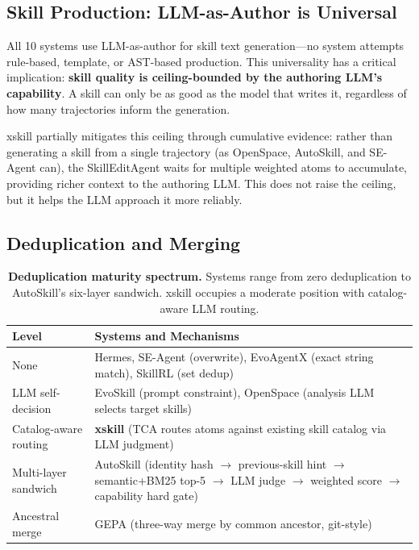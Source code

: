 \documentclass{article}
\begin{document}
\subsection{Skill Production: LLM-as-Author is Universal}

All 10 systems use LLM-as-author for skill text generation---no system attempts rule-based, template, or AST-based production. This universality has a critical implication: \textbf{skill quality is ceiling-bounded by the authoring LLM's capability}. A skill can only be as good as the model that writes it, regardless of how many trajectories inform the generation.

xskill partially mitigates this ceiling through cumulative evidence: rather than generating a skill from a single trajectory (as OpenSpace, AutoSkill, and SE-Agent can), the SkillEditAgent waits for multiple weighted atoms to accumulate, providing richer context to the authoring LLM. This does not raise the ceiling, but it helps the LLM approach it more reliably.

\subsection{Deduplication and Merging}

\begin{table}[t]
\centering
\caption{\textbf{Deduplication maturity spectrum.} Systems range from zero deduplication to AutoSkill's six-layer sandwich. xskill occupies a moderate position with catalog-aware LLM routing.}
\label{tab:dedup}
\small
\begin{tabular}{@{}lp{6.5cm}@{}}
\toprule
\textbf{Level} & \textbf{Systems and Mechanisms} \\
\midrule
None & Hermes, SE-Agent (overwrite), EvoAgentX (exact string match), SkillRL (set dedup) \\
LLM self-decision & EvoSkill (prompt constraint), OpenSpace (analysis LLM selects target skills) \\
Catalog-aware routing & \textbf{xskill} (TCA routes atoms against existing skill catalog via LLM judgment) \\
Multi-layer sandwich & AutoSkill (identity hash $\to$ previous-skill hint $\to$ semantic+BM25 top-5 $\to$ LLM judge $\to$ weighted score $\to$ capability hard gate) \\
Ancestral merge & GEPA (three-way merge by common ancestor, git-style) \\
\bottomrule
\end{tabular}
\end{table}
\end{document}
